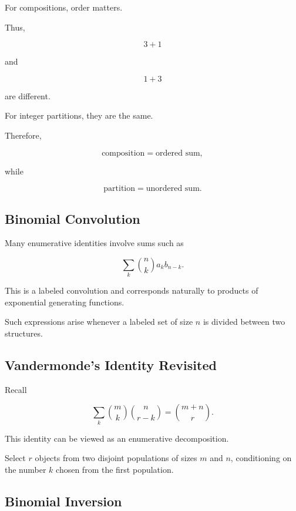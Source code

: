 For compositions, order matters.

Thus,

\[
3+1
\]

and

\[
1+3
\]

are different.

For integer partitions, they are the same.

Therefore,

\[
\boxed{
\text{composition}
=
\text{ordered sum},
}
\]

while

\[
\boxed{
\text{partition}
=
\text{unordered sum}.
}
\]

\subsection{Binomial Convolution}
\label{subsec:binomial-convolution}

Many enumerative identities involve sums such as

\[
\sum_{k}
\binom{n}{k}a_kb_{n-k}.
\]

This is a labeled convolution and corresponds naturally to products of
exponential generating functions.

Such expressions arise whenever a labeled set of size \(n\) is divided
between two structures.

\subsection{Vandermonde's Identity Revisited}
\label{subsec:vandermonde-enumerative}

Recall

\[
\boxed{
\sum_{k}
\binom{m}{k}
\binom{n}{r-k}
=
\binom{m+n}{r}.
}
\]

This identity can be viewed as an enumerative decomposition.

Select \(r\) objects from two disjoint populations of sizes \(m\) and
\(n\), conditioning on the number \(k\) chosen from the first
population.

\subsection{Binomial Inversion}
\label{subsec:binomial-inversion}

